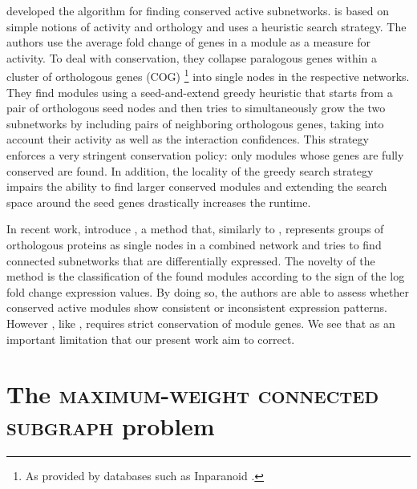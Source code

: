 	\Textcite{deshpande2010scalable} developed the \nexus{} algorithm for finding conserved active subnetworks.
	\nexus{} is based on simple notions of activity and orthology and uses a heuristic search strategy.
	The authors use the average fold change of genes in a module as a measure for activity.
	To deal with conservation, they collapse paralogous genes within a cluster of orthologous genes (COG) \parencite{tatusov1997genomic}\footnote{As provided by databases such as Inparanoid \parencite{obrien2005inparanoid}.} into single nodes in the respective networks.
	They find modules using a seed-and-extend greedy heuristic that starts from a pair of orthologous seed nodes and then tries to simultaneously grow the two subnetworks by including pairs of neighboring orthologous genes, taking into account their activity as well as the interaction confidences.
	This strategy enforces a very stringent conservation policy: only modules whose genes are fully conserved are found.
	In addition, the locality of the greedy search strategy impairs the ability to find larger conserved modules and extending the search space around the seed genes drastically increases the runtime.

	In recent work, \textcite{zinman2015moduleblast} introduce \moduleblast{}, a method that, similarly to \nexus{}, represents groups of orthologous proteins as single nodes in a combined network and tries to find connected subnetworks that are differentially expressed.
	The novelty of the method is the classification of the found modules according to the sign of the log fold change expression values.
	By doing so, the authors are able to assess whether conserved active modules show consistent or inconsistent
  expression patterns.
	However \moduleblast{}, like \nexus{}, requires strict conservation of module genes.
	We see that as an important limitation that our present work aim to correct.

\section{The \textsc{maximum-weight connected subgraph} problem}
\label{sec:mwcsproblem}

